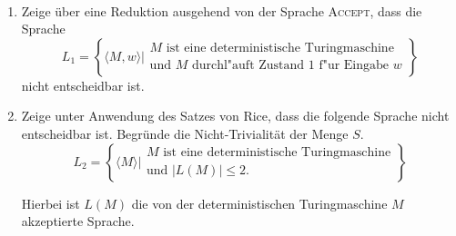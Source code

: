\documentclass{uebung_cs}
\begin{document}
\begin{exercise}\
	\begin{enumerate}
		\item Zeige über eine Reduktion ausgehend von der Sprache \textsc{Accept}, dass die Sprache $$L_1 = \left\{\langle M,w\rangle \mathrel{\Bigg|} \begin{array}{l}M\text{ ist eine deterministische Turingmaschine}\\\text{und }M\text{ durchl"auft Zustand 1 f"ur Eingabe }w\end{array}\right\}$$ nicht entscheidbar ist.
		
		\item Zeige unter Anwendung des Satzes von Rice, dass die folgende Sprache nicht entscheidbar ist. Begründe die Nicht-Trivialität der Menge $S$.
 $$L_2 = \left\{\langle M\rangle \mathrel{\Bigg|} \begin{array}{l}M\text{ ist eine deterministische Turingmaschine}\\\text{und } |L(M)| \leq 2.\end{array}\right\}$$
			
		Hierbei ist $L(M)$ die von der deterministischen Turingmaschine $M$ akzeptierte Sprache.
	\end{enumerate}
\end{exercise}
\end{document}
